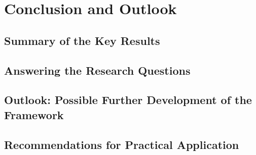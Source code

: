 \chapter{Conclusion and Outlook}
\label{chap:conclusion}

\section{Summary of the Key Results}

\section{Answering the Research Questions}

\section{Outlook: Possible Further Development of the Framework}

\section{Recommendations for Practical Application}
